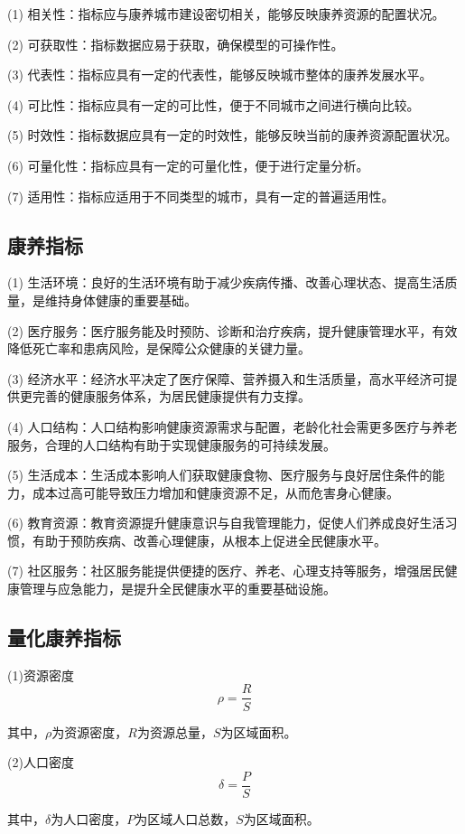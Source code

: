 \documentclass[12pt,a4paper]{article}
\begin{document}
(1) 相关性：指标应与康养城市建设密切相关，能够反映康养资源的配置状况。

(2) 可获取性：指标数据应易于获取，确保模型的可操作性。

(3) 代表性：指标应具有一定的代表性，能够反映城市整体的康养发展水平。

(4) 可比性：指标应具有一定的可比性，便于不同城市之间进行横向比较。

(5) 时效性：指标数据应具有一定的时效性，能够反映当前的康养资源配置状况。

(6) 可量化性：指标应具有一定的可量化性，便于进行定量分析。

(7) 适用性：指标应适用于不同类型的城市，具有一定的普遍适用性。

\subsection{康养指标}

(1) 生活环境：良好的生活环境有助于减少疾病传播、改善心理状态、提高生活质量，是维持身体健康的重要基础。

(2) 医疗服务：医疗服务能及时预防、诊断和治疗疾病，提升健康管理水平，有效降低死亡率和患病风险，是保障公众健康的关键力量。

(3) 经济水平：经济水平决定了医疗保障、营养摄入和生活质量，高水平经济可提供更完善的健康服务体系，为居民健康提供有力支撑。

(4) 人口结构：人口结构影响健康资源需求与配置，老龄化社会需更多医疗与养老服务，合理的人口结构有助于实现健康服务的可持续发展。

(5) 生活成本：生活成本影响人们获取健康食物、医疗服务与良好居住条件的能力，成本过高可能导致压力增加和健康资源不足，从而危害身心健康。

(6) 教育资源：教育资源提升健康意识与自我管理能力，促使人们养成良好生活习惯，有助于预防疾病、改善心理健康，从根本上促进全民健康水平。

(7) 社区服务：社区服务能提供便捷的医疗、养老、心理支持等服务，增强居民健康管理与应急能力，是提升全民健康水平的重要基础设施。

\subsection{量化康养指标}

(1)资源密度
\[
\rho = \frac{R}{S}
\]

其中，$\rho$为资源密度，$R$为资源总量，$S$为区域面积。

(2)人口密度
\[
\delta = \frac{P}{S}
\]

其中，$\delta$为人口密度，$P$为区域人口总数，$S$为区域面积。
\end{document}
